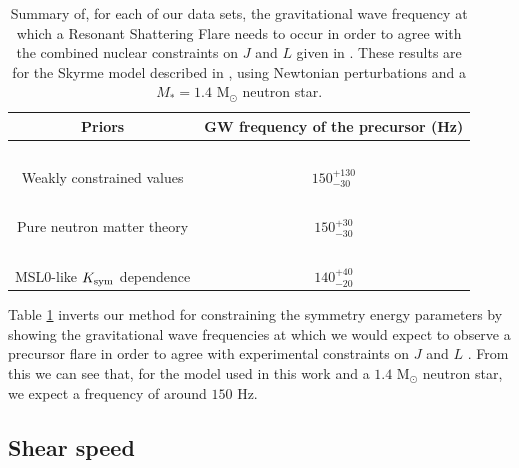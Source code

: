 \documentclass[fleqn,usenatbib]{mnras}
\begin{document}
\begin{table}
\centering
\begin{tabular}{|c|c|}
\hline
Priors&GW frequency of the precursor (Hz)\\

\hline
$ $& $ $\\[-9pt]
Weakly constrained values&$150^{+130}_{-30}$\\
\hline
$ $& $ $\\[-9pt]
Pure neutron matter theory&$150^{+30}_{-30}$\\
\hline
$ $& $ $\\[-9pt]
MSL0-like $K_{\rm sym}$ dependence&$140^{+40}_{-20}$\\
\hline
\end{tabular}
\caption{Summary of, for each of our data sets, the gravitational wave frequency at which a Resonant Shattering Flare needs to occur in order to agree with the combined nuclear constraints on $J$ and $L$ given in \citet{lattimer2013constraining}. These results are for the Skyrme model described in \citet{newton2020nuclear}, using Newtonian perturbations and a $M_*=1.4$ M${_\odot}$ neutron star.}
\label{tab:freq_to_match_nuclear}
\end{table}

Table \ref{tab:freq_to_match_nuclear} inverts our method for constraining the symmetry energy parameters by showing the gravitational wave frequencies at which we would expect to observe a precursor flare in order to agree with experimental constraints on $J$ and $L$ \citep{lattimer2013constraining}. From this we can see that, for the model used in this work and a $1.4$ M$_{\odot}$ neutron star, we expect a frequency of around $150$ Hz.









\subsection{Shear speed}
\end{document}
